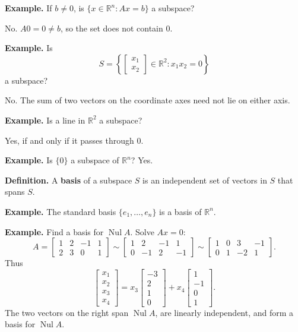 \documentclass{article}
\begin{document}
\bigskip

\textbf{Example.} If $b\ne0$, is $\{x\in\mathbb{R}^n:Ax=b\}$ a subspace?

\medskip

No. $A0=0\ne b$, so the set does not contain $0$.

\bigskip

\textbf{Example.} Is
\[
S=\left\{\begin{bmatrix}x_1\\x_2\end{bmatrix}\in\mathbb{R}^2:x_1x_2=0\right\}
\]
a subspace?

\medskip

No. The sum of two vectors on the coordinate axes need not lie on either axis.

\bigskip

\textbf{Example.} Is a line in $\mathbb{R}^2$ a subspace?

\medskip

Yes, if and only if it passes through $0$.

\medskip

\textbf{Example.} Is $\{0\}$ a subspace of $\mathbb{R}^n$? Yes.

\newpage

\textbf{Definition.} A \textbf{basis} of a subspace $S$ is an independent set of vectors in $S$ that spans $S$.

\medskip

\textbf{Example.} The standard basis $\{e_1,\ldots,e_n\}$ is a basis of $\mathbb{R}^n$.

\bigskip

\textbf{Example.} Find a basis for $\operatorname{Nul} A$. Solve $Ax=0$:
\[
A=
\begin{bmatrix}1&2&-1&1\\2&3&0&1\end{bmatrix}
\sim
\begin{bmatrix}1&2&-1&1\\0&-1&2&-1\end{bmatrix}
\sim
\begin{bmatrix}1&0&3&-1\\0&1&-2&1\end{bmatrix}.
\]
Thus
\[
\begin{bmatrix}x_1\\x_2\\x_3\\x_4\end{bmatrix}
=x_3\begin{bmatrix}-3\\2\\1\\0\end{bmatrix}
+x_4\begin{bmatrix}1\\-1\\0\\1\end{bmatrix}.
\]
The two vectors on the right span $\operatorname{Nul} A$, are linearly independent, and form a basis for $\operatorname{Nul} A$.
\end{document}
